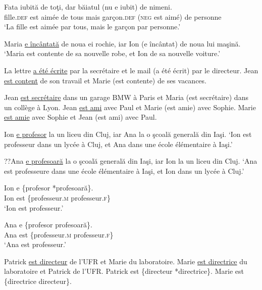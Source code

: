 \ea
\ea
\gll Fata    iubită  de  toţi,  dar  băiatul  (nu  e  iubit)  de nimeni. \label{ch2:ex100a}\\
fille.\textsc{def}  est  aimée  de  tous  mais  garçon.\textsc{def}  (\textsc{neg} est  aimé)  de  personne\\
\glt ‘La fille est aimée par tous, mais le garçon par personne.’

\ex Maria \uline{e încântată} de noua ei rochie, iar Ion (e încântat) de noua lui maşină. \label{ch2:ex100b}
\glt ‘Maria est contente de sa nouvelle robe, et Ion de sa nouvelle voiture.’
\z
\z


\ea
\ea La lettre \uline{a été écrite} par la secrétaire et le mail (a été écrit) par le directeur. \label{ch2:ex101a} 
\ex Jean \uline{est content} de son travail et Marie (est contente) de ses vacances. \label{ch2:ex101b}
\z
\z

\ea
\ea Jean \uline{est secrétaire} dans un garage BMW à Paris et Maria (est secrétaire) dans un collège à Lyon. \label{ch2:ex102a} 
\ex Jean \uline{est ami} avec Paul et Marie (est amie) avec Sophie. \label{ch2:ex102b}
\ex Marie \uline{est amie} avec Sophie et Jean (est ami) avec Paul. \label{ch2:ex102c}
\z
\z


\ea
\ea Ion \uline{e profesor} la un liceu din Cluj, iar Ana la o şcoală generală din Iaşi. \label{ch2:ex103a}
\glt ‘Ion est professeur dans un lycée à Cluj, et Ana dans une école élémentaire à Iaşi.’

\ex  ??Ana \uline{e profesoară} la o şcoală generală din Iaşi, iar Ion la un liceu din Cluj. \label{ch2:ex103b}
\glt ‘Ana est professeure dans une école élémentaire à Iaşi, et Ion dans un lycée à Cluj.’ 

\ex  
\gll Ion  e  \{profesor  {\textbar}  *profesoară\}.\\
Ion  est  \{professeur.\textsc{m}  {\textbar}  professeur.\textsc{f\}}\\
\glt  ‘Ion est professeur.’ 

\ex 
\gll Ana  e  \{profesor  {\textbar}  profesoară\}.\\
Ana  est  \{professeur.\textsc{m}  {\textbar}  professeur.\textsc{f\}}\\
\glt ‘Ana est professeur.’ 
\z
\z


\ea
\ea Patrick \uline{est directeur} de l’UFR et Marie du laboratoire. \label{ch2:ex104a} 
\ex *Marie \uline{est directrice} du laboratoire et Patrick de l’UFR. \label{ch2:ex104b}
\ex Patrick est \{directeur {\textbar} *directrice\}.
\ex Marie est \{directrice {\textbar} directeur\}.
\z
\z

